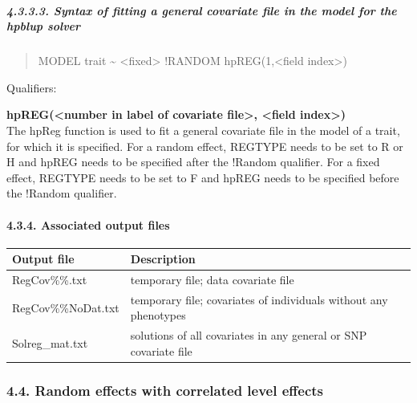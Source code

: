 \subparagraph{4.3.3.3. Syntax of fitting a general covariate file in the
model for the hpblup solver}\label{Obse25}

\begin{quote}
MODEL trait \textasciitilde{} \textless fixed\textgreater{} !RANDOM
hpREG(1,\textless field index\textgreater)
\end{quote}

Qualifiers:

\textbf{hpREG(\textless number in label of covariate file\textgreater,
\textless field index\textgreater)}\\
The hpReg function is used to fit a general covariate file in the model
of a trait, for which it is specified. For a random effect, REGTYPE
needs to be set to R or H and hpREG needs to be specified after the
!Random qualifier. For a fixed effect, REGTYPE needs to be set to F and
hpREG needs to be specified before the !Random qualifier.

\paragraph{4.3.4. Associated output files}\label{Obse27}

{\def\LTcaptype{none} %
\begin{longtable}[]{@{}
  >{\raggedright\arraybackslash}p{}
  >{\raggedright\arraybackslash}p{}@{}}
\toprule\noalign{}
\begin{minipage}[b]{\linewidth}\raggedright
Output file
\end{minipage} & \begin{minipage}[b]{\linewidth}\raggedright
Description
\end{minipage} \\
\midrule\noalign{}
\endhead
\bottomrule\noalign{}
\endlastfoot
RegCov\%\%.txt & temporary file; data covariate file \\
RegCov\%\%NoDat.txt & temporary file; covariates of individuals without
any phenotypes \\
Solreg\_mat.txt & solutions of all covariates in any general or SNP
covariate file \\
\end{longtable}
}

\subsubsection{4.4. Random effects with correlated level
effects}\label{Obse28}

